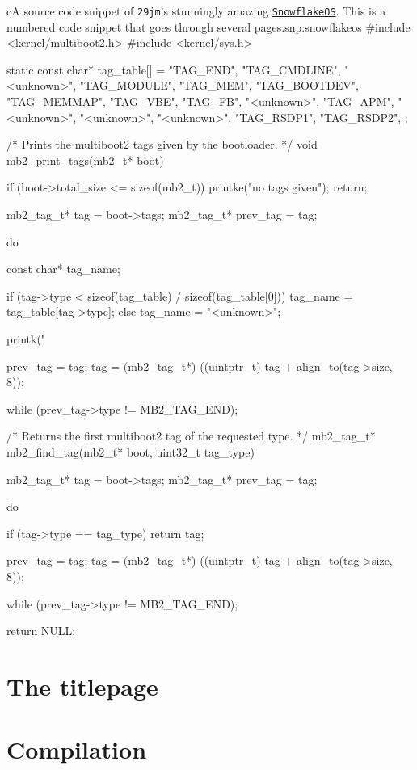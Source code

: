 \begin{snippetnum}{c}{A source code snippet of \texttt{29jm}'s stunningly amazing \href{https://github.com/29jm/SnowflakeOS}{\texttt{SnowflakeOS}}. This is a numbered code snippet that goes through several pages.}{snp:snowflakeos}
    #include <kernel/multiboot2.h>
    #include <kernel/sys.h>

    static const char* tag_table[] = {
    "TAG_END",
    "TAG_CMDLINE",
    "<unknown>",
    "TAG_MODULE",
    "TAG_MEM",
    "TAG_BOOTDEV",
    "TAG_MEMMAP",
    "TAG_VBE",
    "TAG_FB",
    "<unknown>",
    "TAG_APM",
    "<unknown>",
    "<unknown>",
    "<unknown>",
    "TAG_RSDP1",
    "TAG_RSDP2",
    };

    /* Prints the multiboot2 tags given by the bootloader.
    */
    void mb2_print_tags(mb2_t* boot) {
    if (boot->total_size <= sizeof(mb2_t)) {
            printke("no tags given");
            return;
        }

    mb2_tag_t* tag = boot->tags;
    mb2_tag_t* prev_tag = tag;

    do {
    const char* tag_name;

    if (tag->type < sizeof(tag_table) / sizeof(tag_table[0])) {
    tag_name = tag_table[tag->type];
    } else {
            tag_name = "<unknown>";
        }

    printk("%

    prev_tag = tag;
    tag = (mb2_tag_t*) ((uintptr_t) tag + align_to(tag->size, 8));
    } while (prev_tag->type != MB2_TAG_END);
    }

    /* Returns the first multiboot2 tag of the requested type.
    */
    mb2_tag_t* mb2_find_tag(mb2_t* boot, uint32_t tag_type) {
            mb2_tag_t* tag = boot->tags;
            mb2_tag_t* prev_tag = tag;

            do {
                    if (tag->type == tag_type) {
                            return tag;
                        }

                    prev_tag = tag;
                    tag = (mb2_tag_t*) ((uintptr_t) tag + align_to(tag->size, 8));
                } while (prev_tag->type != MB2_TAG_END);

            return NULL;
        }
\end{snippetnum}


\section{The titlepage}

\section{Compilation}
